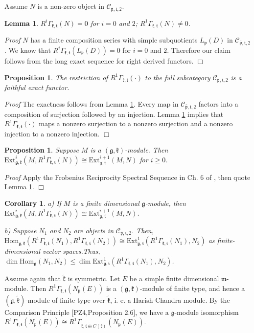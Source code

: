 \documentclass[11pt]{amsart}
\newcounter{theorem}
\newtheorem{lemma}[theo]{Lemma}
\newtheorem{corollary}[theo]{Corollary}
\newtheorem{prop}[theo]{Proposition}
\renewenvironment{proof}{ \emph{Proof}}{$\Box$}
\renewcommand{\tt}{\mathfrak{t}}
\newcommand{\kk}{\mathfrak{k}}
\newcommand{\mm}{\mathfrak{m}}
\newcommand{\pp}{\mathfrak{p}}
\renewcommand{\gg}{\mathfrak{g}}
\newcommand{\refle}[1]{Lemma \ref{#1}}
\newcommand{\Hom}{\mathrm{Hom}}
\newcommand{\Ext}{\mathrm{Ext}}
\begin{document}
Assume $N$ is a non-zero object in $\mathcal{C}_{\bar{\pp},\tt,2}$.
\begin{lemma}\label{lemma7.7}
$R^i\Gamma_{\kk,\tt}(N)=0$ for $i=0$ and $2$; $R^1\Gamma_{\kk,\tt}(N)\neq 0$.
\end{lemma}
\begin{proof}
$N$ has a finite composition series with simple subquotients $L_\pp(D)$ in $\mathcal{C}_{\bar{\pp},\tt,2}$. We know that $R^i\Gamma_{\kk,\tt}(L_\pp(D))=0$ for $i=0$ and $2$. Therefore our claim follows from the long exact sequence for right derived functors.
\end{proof}
\begin{prop}\label{pr7.8}
The restriction of $R^1\Gamma_{\kk,\tt}(\cdot)$ to the full subcategory $\mathcal{C}_{\bar{\pp},\tt,2}$ is a faithful exact functor.
\end{prop}
\begin{proof}
The exactness follows from \refle{lemma7.7}. Every map in $\mathcal{C}_{\bar{\pp},\tt,2}$ factors into a composition of surjection followed by an injection. \refle{lemma7.7} implies that $R^1\Gamma_{\kk,\tt}(\cdot)$ maps a nonzero surjection to a nonzero surjection and a nonzero injection to a nonzero injection.
\end{proof}
\begin{prop}
Suppose $M$ is a $(\gg,\kk)$-module. Then  $\Ext^i_{\gg,\kk}(M,R^1\Gamma_{\kk,\tt}(N))\cong\Ext^{i+1}_{\gg,\tt}(M,N)$ for $i\geq 0$.
\end{prop}
\begin{proof}
Apply the Frobenius Reciprocity Spectral Sequence in Ch. 6 of \cite{V2}, then quote \refle{lemma7.7}.
\end{proof}
\begin{corollary}
a) If $M$ is a finite dimensional $\gg$-module, then $\Ext^i_{\gg,\kk}(M,R^1\Gamma_{\kk,\tt}(N))\cong\Ext^{i+1}_{\gg,\tt}(M,N)$.

b) Suppose $N_1$ and $N_2$ are objects in $\mathcal{C}_{\bar{\pp},\tt,2}$. Then, $\Hom_{\gg,\kk}(R^1\Gamma_{\kk,\tt}(N_1), R^1\Gamma_{\kk,\tt}(N_2))\cong\Ext^1_{\gg,\tt}(R^1\Gamma_{\kk,\tt}(N_1),N_2)$ as finite-dimensional vector spaces.Thus, $\dim\Hom_\gg(N_1,N_2)\leq\dim\Ext^1_{\gg,\tt}(R^1\Gamma_{\kk,\tt}(N_1),N_2)$.
\end{corollary}

Assume again that $\tilde{\kk}$ is symmetric. Let $E$ be a simple finite dimensional $\mm$-module. Then $R^1 \Gamma_{\kk,\tt}(N_\pp(E))$ is a $(\gg,\kk)$-module of finite type, and hence a $(\gg,\tilde{\kk})$-module of finite type over $\tilde{\kk}$, i. e. a Harish-Chandra module. By the Comparison Principle [PZ4,Proposition 2.6], we have a $\gg$-module isomorphism $R^1 \Gamma_{\kk,\tt}(N_\pp(E))\cong R^1 \Gamma_{\tilde{\kk},\tt\oplus C(\kk)}(N_\pp(E))$.
\end{document}
